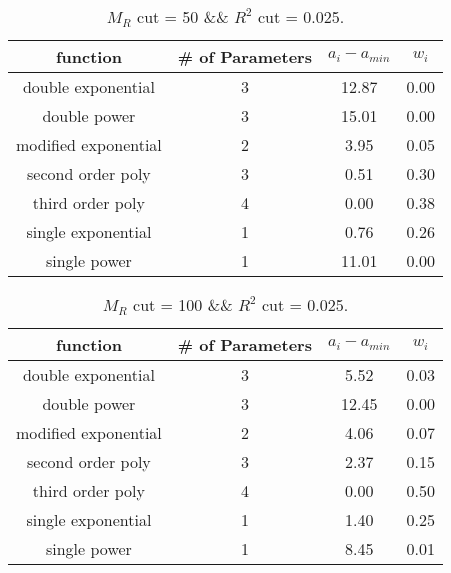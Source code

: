  
\begin{table}[H] 
\begin{center} 
\begin{tabular}{|c|c|c|c|} 
\hline function & \# of Parameters & $a_i-a_{min}$ & $w_i$ \\ \hline 
double exponential &  3 &  12.87 &   0.00 \\ 
double power &  3 &  15.01 &   0.00 \\ 
modified exponential &  2 &   3.95 &   0.05 \\ 
second order poly &  3 &   0.51 &   0.30 \\ 
third order poly &  4 &   0.00 &   0.38 \\ 
single exponential &  1 &   0.76 &   0.26 \\ 
single power &  1 &  11.01 &   0.00 \\ 
\hline 
\end{tabular} 
\caption{$M_R$ cut = 50 \&\& $R^2$ cut = 0.025.} 
\label{tab:FitChoices_50_0.025} 
\end{center} 
\end{table} 
 
 
\begin{table}[H] 
\begin{center} 
\begin{tabular}{|c|c|c|c|} 
\hline function & \# of Parameters & $a_i-a_{min}$ & $w_i$ \\ \hline 
double exponential &  3 &   5.52 &   0.03 \\ 
double power &  3 &  12.45 &   0.00 \\ 
modified exponential &  2 &   4.06 &   0.07 \\ 
second order poly &  3 &   2.37 &   0.15 \\ 
third order poly &  4 &   0.00 &   0.50 \\ 
single exponential &  1 &   1.40 &   0.25 \\ 
single power &  1 &   8.45 &   0.01 \\ 
\hline 
\end{tabular} 
\caption{$M_R$ cut = 100 \&\& $R^2$ cut = 0.025.} 
\label{tab:FitChoices_100_0.025} 
\end{center} 
\end{table} 
 
